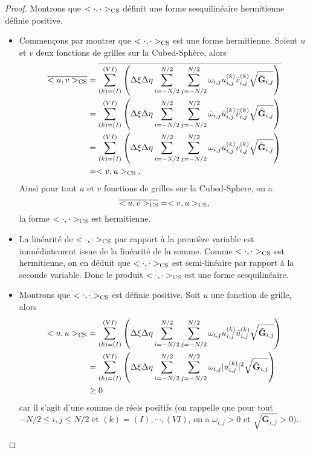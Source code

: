 \begin{proof}
Montrons que $<\cdot, \cdot>_{\text{CS}}$ définit une forme sesquilinéaire hermitienne définie positive.
\begin{itemize}
\item Commençons par montrer que $<\cdot, \cdot>_{\text{CS}}$ est une forme hermitienne.
Soient $u$ et $v$ deux fonctions de grilles sur la Cubed-Sphère, alors
\begin{align*}
\overline{<u,v>_{\text{CS}}} & = \overline{\displaystyle\sum\limits_{(k)=(I)}^{(VI)} \left( \Delta \xi \Delta \eta \displaystyle\sum\limits_{i=-N/2}^{N/2} \displaystyle\sum\limits_{j=-N/2}^{N/2} \omega_{i,j} u_{i,j}^{(k)} \bar{v}_{i,j}^{(k)} \sqrt{\bar{\mathbf{G}}_{i,j}} \right)} \\
	& = \displaystyle\sum\limits_{(k)=(I)}^{(VI)} \left( \Delta \xi \Delta \eta \displaystyle\sum\limits_{i=-N/2}^{N/2} \displaystyle\sum\limits_{j=-N/2}^{N/2} \bar{\omega}_{i,j} \bar{u}_{i,j}^{(k)} \bar{\bar{v}}_{i,j}^{(k)} \sqrt{\bar{\mathbf{G}}_{i,j}} \right) \\
	& = \displaystyle\sum\limits_{(k)=(I)}^{(VI)} \left( \Delta \xi \Delta \eta \displaystyle\sum\limits_{i=-N/2}^{N/2} \displaystyle\sum\limits_{j=-N/2}^{N/2} \omega_{i,j} \bar{u}_{i,j}^{(k)} v_{i,j}^{(k)} \sqrt{\bar{\mathbf{G}}_{i,j}} \right) \\
	& = <v,u>_{\text{CS}}.
\end{align*}
Ainsi pour tout $u$ et $v$ fonctions de grilles sur la Cubed-Sphere, on a
\begin{equation}
\overline{<u,v>_{\text{CS}}} = <v,u>_{\text{CS}},
\end{equation}
la forme $<\cdot, \cdot>_{\text{CS}}$ est hermitienne.

\item La linéarité de $<\cdot, \cdot>_{\text{CS}}$ par rapport à la première variable est immédiatement issue de la linéarité de la somme. Comme $<\cdot, \cdot>_{\text{CS}}$ est hermitienne, on en déduit que $<\cdot, \cdot>_{\text{CS}}$ est semi-linéaire par rapport à la seconde variable. Donc le produit $<\cdot, \cdot>_{\text{CS}}$ est une forme sesquilinéaire.

\item Montrons que $<\cdot, \cdot>_{\text{CS}}$ est définie positive. Soit $u$ une fonction de grille, alors
\begin{align*}
<u,u>_{\text{CS}} & = \displaystyle\sum\limits_{(k)=(I)}^{(VI)} \left( \Delta \xi \Delta \eta \displaystyle\sum\limits_{i=-N/2}^{N/2} \displaystyle\sum\limits_{j=-N/2}^{N/2} \omega_{i,j} u_{i,j}^{(k)} \bar{u}_{i,j}^{(k)} \sqrt{\bar{\mathbf{G}}_{i,j}} \right) \\
	& = \displaystyle\sum\limits_{(k)=(I)}^{(VI)} \left( \Delta \xi \Delta \eta \displaystyle\sum\limits_{i=-N/2}^{N/2} \displaystyle\sum\limits_{j=-N/2}^{N/2} \omega_{i,j} |u_{i,j}^{(k)}|^2 \sqrt{\bar{\mathbf{G}}_{i,j}} \right) \\
	& \geq 0
\end{align*}
car il s'agit d'une somme de réels positifs (on rappelle que pour tout $-N/2 \leq i,j \leq N/2$ et $(k)=(I) , \cdots, (VI)$, on a $\omega_{i,j}>0$ et $\sqrt{\bar{\mathbf{G}}_{i,j}}>0$).


\end{itemize}
\end{proof}
